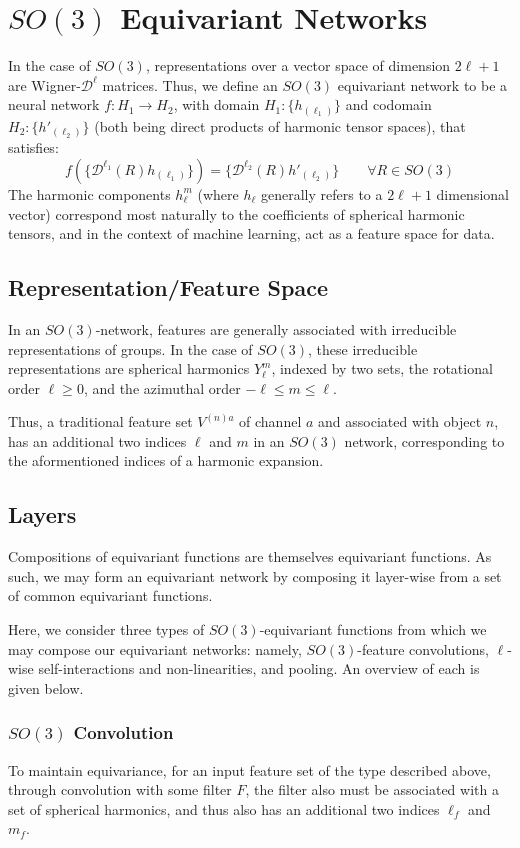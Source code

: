 \documentclass[10pt,a4paper]{article}
\begin{document}
\section{$SO(3)$ Equivariant Networks}
In the case of $SO(3)$, representations over a vector space of dimension $2\ell+1$ are Wigner-$\mathcal{D}^{\ell}$ matrices. Thus, we define an $SO(3)$ equivariant network to be a neural network $f:H_1 \rightarrow H_2$, with domain $H_1:\lbrace h_{(\ell_1)}\rbrace$ and codomain $H_2:\lbrace h'_{(\ell_2)}\rbrace$ (both being direct products of harmonic tensor spaces), that satisfies:
$$
f(\lbrace \mathcal{D}^{\ell_1}(R)h_{(\ell_1)}\rbrace) = \lbrace\mathcal{D}^{\ell_2}(R) h'_{(\ell_2)}\rbrace \quad\quad \forall R\in SO(3)
$$
The harmonic components $h_{\ell}^m$ (where $h_{\ell}$ generally refers to a $2\ell+1$ dimensional vector) correspond most naturally to the coefficients of spherical harmonic tensors, and in the context of machine learning, act as a feature space for data.

\subsection{Representation/Feature Space}
In an $SO(3)$-network, features are generally associated with irreducible representations of groups. In the case of $SO(3)$, these irreducible representations are spherical harmonics $Y_{\ell}^m$, indexed by two sets, the rotational order $\ell\geq 0$, and the azimuthal order $-\ell\leq m \leq \ell$.

Thus, a traditional feature set $V^{(n)a}$ of channel $a$ and associated with object $n$, has an additional two indices $\ell$ and $m$ in an $SO(3)$ network, corresponding to the aformentioned indices of a harmonic expansion.


\subsection{Layers}
Compositions of equivariant functions are themselves equivariant functions. As such, we may form an equivariant network by composing it layer-wise from a set of common equivariant functions.

Here, we consider three types of $SO(3)$-equivariant functions from which we may compose our equivariant networks: namely, $SO(3)$-feature convolutions, $\ell$-wise self-interactions and non-linearities, and pooling. An overview of each is given below.

\subsubsection{$SO(3)$ Convolution}
To maintain equivariance, for an input feature set of the type described above,  through convolution with some filter $F$,  the filter also must be associated with a set of spherical harmonics, and thus also has an additional two indices $\ell_f$ and $m_f$. 
\end{document}
